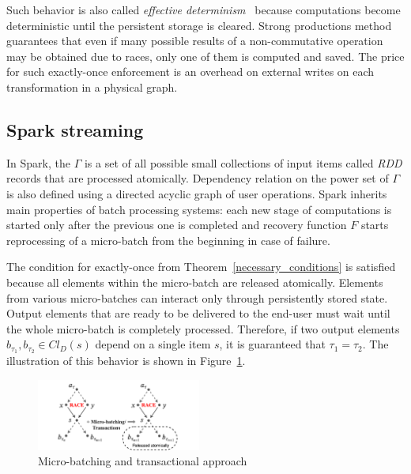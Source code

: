 Such behavior is also called {\em effective determinism}~\cite{akidau2018streaming} because computations become deterministic until the persistent storage is cleared. Strong productions method guarantees that even if many possible results of a non-commutative operation may be obtained due to races, only one of them is computed and saved. The price for such exactly-once enforcement is an overhead on external writes on each transformation in a physical graph.

\subsection{Spark streaming}

In Spark, the  $\Gamma$   is a set of all possible small collections of input items called  {\em RDD} records that are processed atomically.
Dependency relation on the power set of $\Gamma$ is also defined using a directed acyclic graph of user operations. 
Spark inherits main properties of batch processing systems:  each new stage of computations is started only after the previous one is completed and recovery function $F$ starts reprocessing of a micro-batch from the beginning in case of failure.

The condition for exactly-once from Theorem~\ref{necessary_conditions} is satisfied because all elements within the micro-batch are released atomically. Elements from various micro-batches can interact only through persistently stored state. 
Output elements that are ready to be delivered to the end-user must wait until the whole micro-batch is completely processed. 
Therefore, if two output elements $b_{\tau_1},b_{\tau_2} \in Cl_D(s)$ depend on a single item $s$, it is guaranteed that $\tau_1=\tau_2$. The illustration of this behavior is shown in Figure~\ref{spark_flink}. 
 
\begin{figure}[htbp]
  \centering
  \includegraphics[width=0.48\textwidth]{Chapters/DeliveryGuarantees/pics/spark-flink.png}
  \caption{Micro-batching and transactional approach}
  \label{spark_flink}
\end{figure}
 

